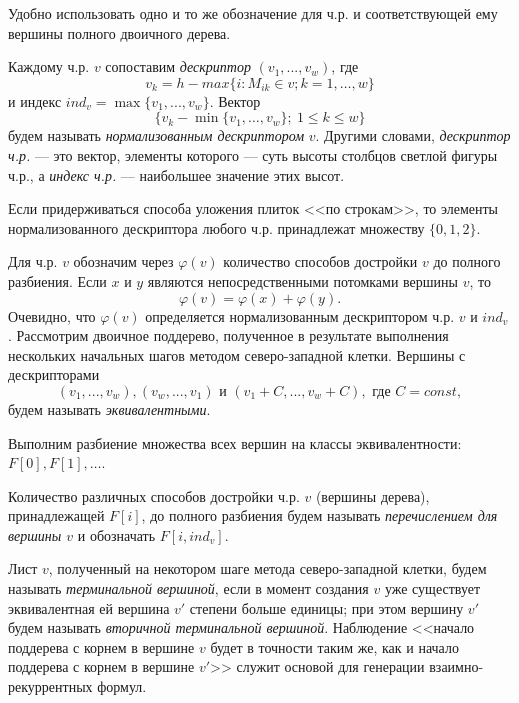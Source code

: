 \begin{remark} Удобно использовать одно и то же обозначение для ч.р. и соответствующей ему вершины полного двоичного дерева.
\end{remark}
Каждому ч.р. $v$ сопоставим \textit{ дескриптор} $(v_1,...,v_w)$, где
$$
v_k  = h-max\{i: M_{ik}\in v; k=1,\dots, w\}
$$
и индекс $ind_v= \max\{v_1,...,v_w\}$. Вектор
$$\{v_k-\min\{v_1,\dots,v_w\};\ 1\leq k\leq w\}$$
будем называть \textit{ нормализованным дескриптором} $v$. Другими словами, \textit{ дескриптор ч.р.} --- это вектор, элементы которого --- суть высоты столбцов светлой фигуры ч.р., а \textit{ индекс ч.р.} --- наибольшее значение этих высот.
\begin {remark} Если придерживаться способа уложения плиток <<по строкам>>, то элементы нормализованного дескриптора любого ч.р. принадлежат множеству \linebreak $\{0, 1, 2\}$.
\end{remark}
Для ч.р. $v$ обозначим через $\varphi(v)$ количество способов достройки $v$ до полного разбиения. Если $x$ и $y$ являются непосредственными потомками вершины $v$, то
\begin{equation}\label{akm1eq03}
\varphi(v)=\varphi(x)+\varphi(y).
\end{equation}
Очевидно, что $\varphi(v)$ определяется нормализованным дескриптором ч.р. $v$ и $ind_v$.
Рассмотрим двоичное поддерево, полученное в результате выполнения нескольких начальных шагов методом северо-западной клетки. Вершины с дескрипторами
$$
(v_1,...,v_w), (v_w,...,v_1) \text{ и }  (v_1  + C,...,v_w  + C),
\text{ где } C = const,
$$
будем называть \textit{ эквивалентными}.

Выполним разбиение множества всех вершин на классы эквивалентности: \linebreak $F[0], F[1], \dots$.

Количество различных способов достройки ч.р. $v$ (вершины дерева), принадлежащей $F[i]$, до полного разбиения будем называть \textit{ перечислением для вершины $v$} и обозначать $F[i,ind_v]$.

Лист $v$, полученный на некотором шаге метода северо-западной клетки, будем называть \textit{ терминальной вершиной}, если в момент создания $v$ уже существует эквивалентная ей вершина $v'$ степени больше единицы; при этом вершину $v'$ будем называть \textit{ вторичной терминальной вершиной}.  Наблюдение <<начало поддерева с корнем в вершине $v$ будет в точности таким же, как и начало поддерева с корнем в вершине $v'$>> служит основой для генерации взаимно-рекуррентных формул.

